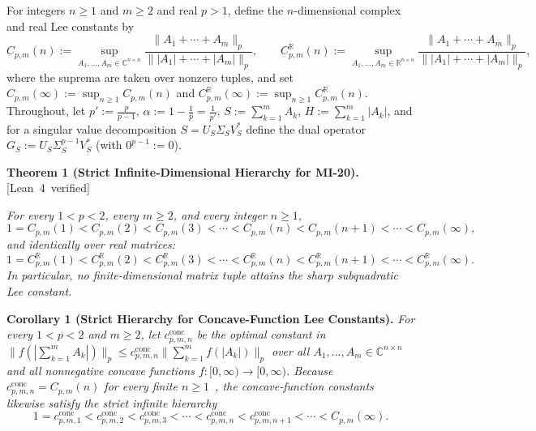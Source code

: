 \documentclass[10pt,letterpaper]{article}
\newcommand{\leanbadge}[1]{\mbox{\sffamily\scriptsize\color{leanborder}[#1]}}
\newcommand{\C}{\mathbb{C}}
\newcommand{\R}{\mathbb{R}}
\newcommand{\conc}{\mathrm{conc}}
\begin{document}
For integers $n \ge 1$ and $m \ge 2$ and real $p > 1$, define the $n$-dimensional complex and real Lee constants by
\begin{equation}\label{eq:defC}
  C_{p,m}(n) := \sup_{A_1,\dots,A_m \in \C^{n\times n}} \frac{\|A_1 + \cdots + A_m\|_p}{\||A_1| + \cdots + |A_m|\|_p},
  \qquad
  C_{p,m}^{\R}(n) := \sup_{A_1,\dots,A_m \in \R^{n\times n}} \frac{\|A_1 + \cdots + A_m\|_p}{\||A_1| + \cdots + |A_m|\|_p},
\end{equation}
where the suprema are taken over nonzero tuples, and set $C_{p,m}(\infty) := \sup_{n \ge 1} C_{p,m}(n)$ and $C_{p,m}^{\R}(\infty) := \sup_{n \ge 1} C_{p,m}^{\R}(n)$. Throughout, let $p' := \frac{p}{p-1}$, $\alpha := 1 - \frac{1}{p} = \frac{1}{p'}$, $S := \sum_{k=1}^m A_k$, $H := \sum_{k=1}^m |A_k|$, and for a singular value decomposition $S = U_S \Sigma_S V_S^*$ define the dual operator $G_S := U_S \Sigma_S^{p-1} V_S^*$ (with $0^{p-1} := 0$).

\begin{tcolorbox}[mathbox]
\textbf{Theorem 1 (Strict Infinite-Dimensional Hierarchy for MI-20).}\hfill\leanbadge{Lean~4 verified}\par\vspace{1.5pt}
\emph{For every $1 < p < 2$, every $m \ge 2$, and every integer $n \ge 1$,}
\[
  1 = C_{p,m}(1) < C_{p,m}(2) < C_{p,m}(3) < \cdots < C_{p,m}(n) < C_{p,m}(n+1) < \cdots < C_{p,m}(\infty),
\]
\emph{and identically over real matrices:}
\[
  1 = C_{p,m}^{\R}(1) < C_{p,m}^{\R}(2) < C_{p,m}^{\R}(3) < \cdots < C_{p,m}^{\R}(n) < C_{p,m}^{\R}(n+1) < \cdots < C_{p,m}^{\R}(\infty).
\]
\emph{In particular, no finite-dimensional matrix tuple attains the sharp subquadratic Lee constant.}
\end{tcolorbox}

\begin{tcolorbox}[lemmabox]
\textbf{Corollary 1 (Strict Hierarchy for Concave-Function Lee Constants).}
\emph{For every $1 < p < 2$ and $m \ge 2$, let $c_{p,m,n}^{\conc}$ be the optimal constant in $\|f(|\sum_{k=1}^m A_k|)\|_p \le c_{p,m,n}^{\conc} \|\sum_{k=1}^m f(|A_k|)\|_p$ over all $A_1,\dots,A_m \in \C^{n\times n}$ and all nonnegative concave functions $f : [0,\infty) \to [0,\infty)$. Because $c_{p,m,n}^{\conc} = C_{p,m}(n)$ for every finite $n \ge 1$~\cite[Theorem~1.1]{Li2026}, the concave-function constants likewise satisfy the strict infinite hierarchy}
\[
  1 = c_{p,m,1}^{\conc} < c_{p,m,2}^{\conc} < c_{p,m,3}^{\conc} < \cdots < c_{p,m,n}^{\conc} < c_{p,m,n+1}^{\conc} < \cdots < C_{p,m}(\infty).
\]
\end{tcolorbox}
\end{document}

